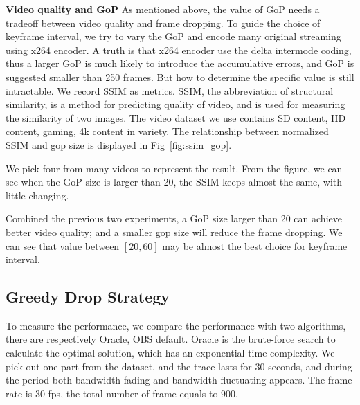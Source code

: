 
\textbf{Video quality and GoP} As mentioned above, the value of GoP needs a tradeoff between video quality and frame dropping. To guide the choice of keyframe interval, we try to vary the GoP and encode many original streaming using x264 encoder\cite{x264}. A truth is that x264 encoder use the delta intermode coding, thus a larger GoP is much likely to introduce the accumulative errors, and GoP is suggested smaller than 250 frames. But how to determine the specific value is still intractable. We record SSIM as metrics. SSIM, the abbreviation of structural similarity, is a method for predicting quality of video, and is used for measuring the similarity of two images\cite{wang2004image}. The video dataset we use contains SD content, HD content, gaming, 4k content in variety\cite{video dataset}. The relationship between normalized SSIM and gop size is displayed in Fig~\ref{fig:ssim_gop}.

We pick four from many videos to represent the result. From the figure, we can see when the GoP size is larger than 20, the SSIM keeps almost the same, with little changing.

Combined the previous two experiments, a GoP size larger than 20 can achieve better video quality; and a smaller gop size will reduce the frame dropping. We can see that value between $[20,60]$ may be almost the best choice for keyframe interval.

\iffalse

\textbf{Varying bitrate.}
To make the conclusion more visible, we fix key frame interval to be 8s and introduce network interruption between 19s and 21s. In different experiments, we provide sufficient network bandwidth and vary the bitrate to be 1000kbps, 1500kbps, 2000kbps, and 2500kbps. The frame drop is shown in Table~\ref{tab:bitrate}. The different bitrates do not make much difference, the number of drop in all cases is about 149.

\textbf{Summary.} We summarize and get conclusions. First, reducing keyframe interval leads to less frame drop. Second, bitrate does not influence frame drop for the short-term case, but the quality of each picture. Preliminary Evaluation points out that a small GoP is one useful try.
\fi

\subsection{Greedy Drop Strategy}
To measure the performance, we compare the performance with two algorithms, there are respectively Oracle, OBS default. Oracle is the brute-force search to calculate the optimal solution, which has an exponential time complexity. We pick out one part from the dataset, and the trace lasts for $30$ seconds, and during the period both bandwidth fading and bandwidth fluctuating appears. The frame rate is $30$ fps, the total number of frame equals to $900$.

